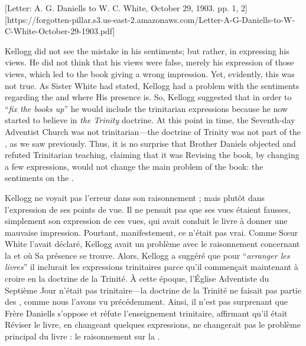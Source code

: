 [Letter: A. G. Daniells to W. C. White, October 29, 1903. pp. 1, 2][https://forgotten-pillar.s3.us-east-2.amazonaws.com/Letter-A-G-Daniells-to-W-C-White-October-29-1903.pdf]


Kellogg did not see the mistake in his sentiments; but rather, in expressing his views. He did not think that his views were false, merely his expression of those views, which led to the book giving a wrong impression. Yet, evidently, this was not true. As Sister White had stated, Kellogg had a problem with the sentiments regarding the  and where His presence is. So, Kellogg suggested that in order to “\textit{fix the books up}” he would include the trinitarian expressions because he now started to believe in \textit{the Trinity} doctrine. At this point in time, the Seventh-day Adventist Church was not trinitarian—the doctrine of Trinity was not part of the , as we saw previously. Thus, it is no surprise that Brother Daniels objected and refuted Trinitarian teaching, claiming that it was Revising the book, by changing a few expressions, would not change the main problem of the book: the sentiments on the .


Kellogg ne voyait pas l'erreur dans son raisonnement ; mais plutôt dans l'expression de ses points de vue. Il ne pensait pas que ses vues étaient fausses, simplement son expression de ces vues, qui avait conduit le livre à donner une mauvaise impression. Pourtant, manifestement, ce n'était pas vrai. Comme Sœur White l'avait déclaré, Kellogg avait un problème avec le raisonnement concernant la  et où Sa présence se trouve. Alors, Kellogg a suggéré que pour “\textit{arranger les livres}” il inclurait les expressions trinitaires parce qu'il commençait maintenant à croire en la doctrine de la Trinité. À cette époque, l'Église Adventiste du Septième Jour n'était pas trinitaire—la doctrine de la Trinité ne faisait pas partie des , comme nous l'avons vu précédemment. Ainsi, il n'est pas surprenant que Frère Daniells s'oppose et réfute l'enseignement trinitaire, affirmant qu'il était Réviser le livre, en changeant quelques expressions, ne changerait pas le problème principal du livre : le raisonnement sur la .


